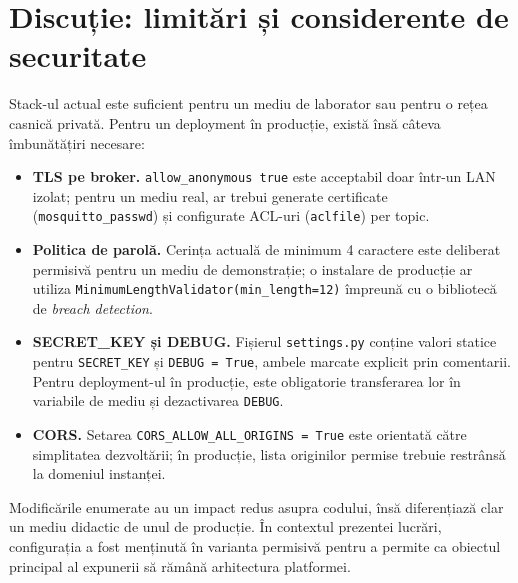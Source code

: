 \section{Discuție: limitări și considerente de securitate}
Stack-ul actual este suficient pentru un mediu de laborator sau pentru o rețea casnică privată. Pentru un deployment în producție, există însă câteva îmbunătățiri necesare:
\begin{itemize}
    \item \textbf{TLS pe broker.} \texttt{allow\_anonymous true} este acceptabil doar într-un LAN izolat; pentru un mediu real, ar trebui generate certificate (\texttt{mosquitto\_passwd}) și configurate ACL-uri (\texttt{aclfile}) per topic.
    \item \textbf{Politica de parolă.} Cerința actuală de minimum 4 caractere este deliberat permisivă pentru un mediu de demonstrație; o instalare de producție ar utiliza \texttt{MinimumLengthValidator(min\_length=12)} împreună cu o bibliotecă de \emph{breach detection}.
    \item \textbf{SECRET\_KEY și DEBUG.} Fișierul \texttt{settings.py} conține valori statice pentru \texttt{SECRET\_KEY} și \texttt{DEBUG = True}, ambele marcate explicit prin comentarii. Pentru deployment-ul în producție, este obligatorie transferarea lor în variabile de mediu și dezactivarea \texttt{DEBUG}.
    \item \textbf{CORS.} Setarea \texttt{CORS\_ALLOW\_ALL\_ORIGINS = True} este orientată către simplitatea dezvoltării; în producție, lista originilor permise trebuie restrânsă la domeniul instanței.
\end{itemize}
Modificările enumerate au un impact redus asupra codului, însă diferențiază clar un mediu didactic de unul de producție. În contextul prezentei lucrări, configurația a fost menținută în varianta permisivă pentru a permite ca obiectul principal al expunerii să rămână arhitectura platformei.
